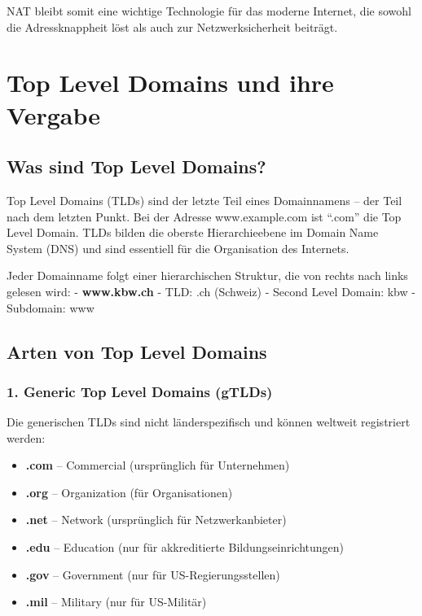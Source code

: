 \documentclass[
  nswissgerman,
  a4paper,
  DIV=11,
  numbers=noendperiod,
  ngerman]{scrreprt}
\providecommand{\tightlist}{%
  \setlength{\itemsep}{0pt}\setlength{\parskip}{0pt}}
\begin{document}
NAT bleibt somit eine wichtige Technologie für das moderne Internet, die
sowohl die Adressknappheit löst als auch zur Netzwerksicherheit
beiträgt.

\chapter{Top Level Domains und ihre
Vergabe}\label{top-level-domains-und-ihre-vergabe}

\section{Was sind Top Level Domains?}\label{was-sind-top-level-domains}

Top Level Domains (TLDs) sind der letzte Teil eines Domainnamens -- der
Teil nach dem letzten Punkt. Bei der Adresse www.example.com ist
``.com'' die Top Level Domain. TLDs bilden die oberste Hierarchieebene
im Domain Name System (DNS) und sind essentiell für die Organisation des
Internets.

Jeder Domainname folgt einer hierarchischen Struktur, die von rechts
nach links gelesen wird: - \textbf{www.kbw.ch} - TLD: .ch (Schweiz) -
Second Level Domain: kbw - Subdomain: www

\section{Arten von Top Level Domains}\label{arten-von-top-level-domains}

\subsection{1. Generic Top Level Domains
(gTLDs)}\label{generic-top-level-domains-gtlds}

Die generischen TLDs sind nicht länderspezifisch und können weltweit
registriert werden:

\begin{itemize}
\tightlist
\item
  \textbf{.com} -- Commercial (ursprünglich für Unternehmen)
\item
  \textbf{.org} -- Organization (für Organisationen)
\item
  \textbf{.net} -- Network (ursprünglich für Netzwerkanbieter)
\item
  \textbf{.edu} -- Education (nur für akkreditierte
  Bildungseinrichtungen)
\item
  \textbf{.gov} -- Government (nur für US-Regierungsstellen)
\item
  \textbf{.mil} -- Military (nur für US-Militär)
\end{itemize}
\end{document}
